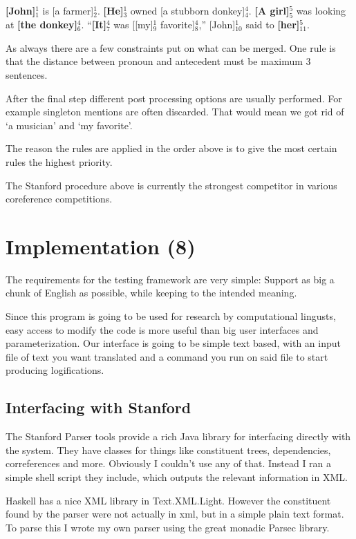 \documentclass[12pt]{article}
\let\stdsection\section
\renewcommand\section{\newpage\stdsection}
\begin{document}
\begin{description}
\textbf{[John]$_1^1$} is [a farmer]$_2^1$. \textbf{[He]$_3^1$} owned [a stubborn donkey]$_4^4$.\newline
\textbf{[A girl]$_5^5$} was looking at \textbf{[the donkey]$_6^4$}.\newline
``\textbf{[It]$_7^4$} was [[my]$_9^1$ favorite]$_8^4$,'' [John]$_{10}^1$ said to \textbf{[her]$_{11}^{5}$}.

As always there are a few constraints put on what can be merged. One rule is that the distance between pronoun and antecedent must be maximum 3 sentences.
\end{description}

After the final step different post processing options are usually performed. For example singleton mentions are often discarded. That would mean we got rid of `a musician' and `my favorite'.

The reason the rules are applied in the order above is to give the most certain rules the highest priority.

The Stanford procedure above is currently the strongest competitor in various coreference competitions.

\section{Implementation (8)}

The requirements for the testing framework are very simple: Support as big a chunk of English as possible, while keeping to the intended meaning.

Since this program is going to be used for research by computational lingusts, easy access to modify the code is more useful than big user interfaces and parameterization. Our interface is going to be simple text based, with an input file of text you want translated and a command you run on said file to start producing logifications.

\subsection{Interfacing with Stanford}

The Stanford Parser tools provide a rich Java library for interfacing directly with the system. They have classes for things like constituent trees, dependencies, correferences and more. Obviously I couldn't use any of that. Instead I ran a simple shell script they include, which outputs the relevant information in XML.

Haskell has a nice XML library in Text.XML.Light. However the constituent found by the parser were not actually in xml, but in a simple plain text format. To parse this I wrote my own parser using the great monadic Parsec library.
\end{document}
